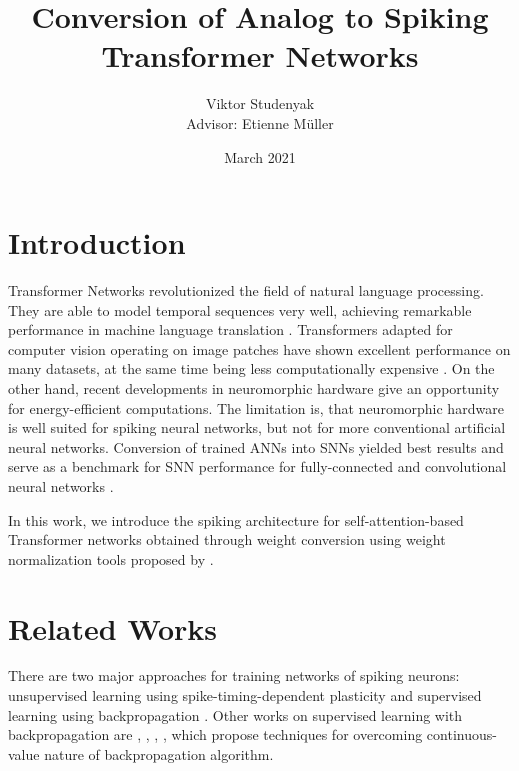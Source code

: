 \documentclass{article}
\title{Conversion of Analog to Spiking Transformer Networks}
\author{Viktor Studenyak\\[0.5cm]{Advisor: Etienne Müller}}
\date{\small March 2021}
\begin{document}
\maketitle

\section{Introduction}

Transformer Networks revolutionized the field of natural language processing. They are able to model temporal sequences very well, achieving remarkable performance in machine language translation \cite{transformer}. Transformers adapted for computer vision operating on image patches have shown excellent performance on many datasets, at the same time being less computationally expensive \cite{vision_transformer}. On the other hand, recent developments in neuromorphic hardware give an opportunity for energy-efficient computations. The limitation is, that neuromorphic hardware is well suited for spiking neural networks, but not for more conventional artificial neural networks. Conversion of trained ANNs into SNNs yielded best results \cite{snn_overview}  and serve as a  benchmark for SNN performance for fully-connected and convolutional neural networks \cite{dl_in_snn}.

In this work, we introduce the spiking architecture for self-attention-based Transformer networks obtained through weight conversion using weight normalization tools proposed by \cite{rueckauer2016theory}.

\section{Related Works}
There are two major approaches for training networks of spiking neurons: unsupervised learning using spike-timing-dependent plasticity \cite{unsupervised_stdp} and supervised learning using backpropagation \cite{snn_backpropagation}. Other works on supervised learning with backpropagation are \cite{supervised_temporal_coding}, \cite{event_driven_backprop}, \cite{slayer}, \cite{surrogate}, which propose techniques for overcoming continuous-value nature of backpropagation algorithm.
\end{document}
